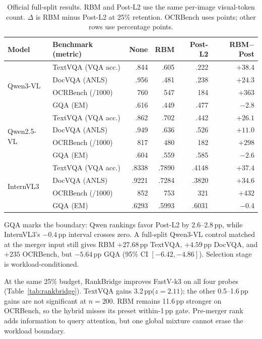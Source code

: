 \documentclass[smallabstract,smallcaptions]{dccpaper}
\newcommand{\pp}{\,pp\xspace}
\begin{document}
\begin{table}[t]
\begin{center}
\caption{\label{tab:main}Official full-split results. RBM and Post-L2 use the
same per-image visual-token count. $\Delta$ is RBM minus Post-L2 at 25\%
retention. OCRBench uses points; other rows use percentage points.}
{\renewcommand{\baselinestretch}{0.93}\footnotesize
\setlength{\tabcolsep}{2.5pt}
\begin{tabular}{llrrrr}
\toprule
Model & Benchmark (metric) & None & RBM & Post-L2 & RBM$-$Post \\
\midrule
\multirow{4}{*}{Qwen3-VL}
 & TextVQA (VQA acc.) & .844 & .605 & .222 & $+38.4$ \\
 & DocVQA (ANLS)      & .956 & .481 & .238 & $+24.3$ \\
 & OCRBench (/1000)   & 760  & 547  & 184  & $+363$ \\
 & GQA (EM)           & .616 & .449 & .477 & $-2.8$ \\
\midrule
\multirow{4}{*}{Qwen2.5-VL}
 & TextVQA (VQA acc.) & .862 & .702 & .442 & $+26.1$ \\
 & DocVQA (ANLS)      & .949 & .636 & .526 & $+11.0$ \\
 & OCRBench (/1000)   & 817  & 480  & 182  & $+298$ \\
 & GQA (EM)           & .604 & .559 & .585 & $-2.6$ \\
\midrule
\multirow{4}{*}{InternVL3}
 & TextVQA (VQA acc.) & .8338 & .7890 & .4148 & $+37.4$ \\
 & DocVQA (ANLS)      & .9221 & .7284 & .3820 & $+34.6$ \\
 & OCRBench (/1000)   & 852   & 753   & 321   & $+432$ \\
 & GQA (EM)           & .6293 & .5993 & .6031 & $-0.4$ \\
\bottomrule
\end{tabular}}
\end{center}
\end{table}

GQA marks the boundary: Qwen rankings favor Post-L2 by 2.6--2.8\pp, while
InternVL3's $-0.4$\pp interval crosses zero. A full-split Qwen3-VL control
matched at the merger input still gives RBM $+27.68$\pp TextVQA,
$+4.59$\pp DocVQA, and $+235$ OCRBench, but $-5.64$\pp GQA (95\% CI
$[-6.42,-4.86]$). Selection stage is workload-conditioned.


At the same 25\% budget, RankBridge improves FastV-k3 on all four probes
(Table~\ref{tab:rankbridge}). TextVQA gains 3.2\pp ($z=2.11$); the other
0.5--1.6\pp gains are not significant at $n=200$. RBM remains 11.6\pp stronger
on OCRBench, so the hybrid misses its preset within-1\pp gate. Pre-merger rank
adds information to query attention, but one global mixture cannot erase the
workload boundary.
\end{document}
